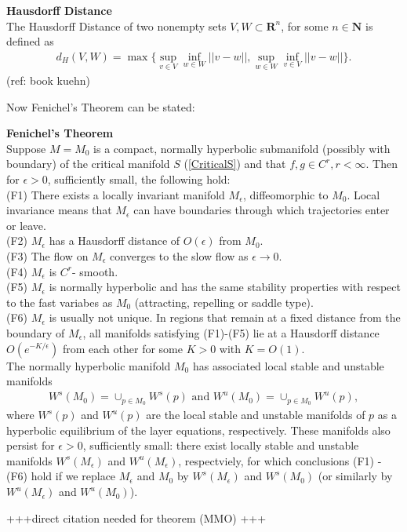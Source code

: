 \begin{definition}{\textbf{Hausdorff Distance}}\\
	The Hausdorff Distance of two nonempty sets $V,W \subset \mathbf{R}^n$, for some $n \in \mathbf{N}$ 
	is defined as 
	\begin{align*}
	d_H(V,W)= \max \{ \sup_{v \in V} \inf_{w \in W} || v- w ||, \sup_ {w \in W}\inf_{v \in V} || v- w ||\}.
	\end{align*}
	(ref: book kuehn)
\end{definition}

Now Fenichel's Theorem can be stated:
\begin{theorem}{\textbf{Fenichel's Theorem}} \label{Fenichel}
	\\
	Suppose $M=M_0$ is a compact, normally hyperbolic submanifold  (possibly with boundary) of the critical manifold $S$ (\ref{CriticalS}) and  that $f, g \in C^r, r < \infty $. Then for $\epsilon >0$, sufficiently small, the following hold:\\
	(F1) There exists a locally invariant manifold $M_{\epsilon}$, diffeomorphic to  $M_0$. Local invariance means that $M_{\epsilon}$ can have boundaries through which trajectories enter or leave.\\
	(F2) $M_{\epsilon}$ has a Hausdorff distance of $O(\epsilon)$ from $M_0$.\\
	(F3) The flow on $M_{\epsilon}$  converges to the slow flow as $\epsilon \to 0$.\\
	(F4) $M_{\epsilon}$ is $C^r$- smooth.\\
	(F5) $M_{\epsilon}$ is normally hyperbolic and has the same stability properties with respect to the fast variabes as $M_0$ (attracting, repelling or saddle type).\\
	(F6) $M_{\epsilon}$ is usually not unique. In regions that remain at a fixed distance from the boundary of  $M_{\epsilon}$, all manifolds satisfying (F1)-(F5) lie at a Hausdorff distance $O(e^{-K/\epsilon})$ from each other for some $K>0$ with $K=O(1)$.\\
	The normally hyperbolic manifold $M_0$ has associated local stable and unstable manifolds
	\begin{align*}
	W^s(M_0) =\cup_{p \in M_0} W^s(p) \textrm{\ \ and\ \ } W^u(M_0) =\cup_{p \in M_0} W^u(p),
	\end{align*}
	where  $W^s(p)$ and $W^u(p)$ are the local stable and unstable manifolds of $p$ as a hyperbolic equilibrium of the layer equations, respectively. These manifolds also persist for $\epsilon > 0$, sufficiently small: there exist locally stable and unstable manifolds $W^s(M_\epsilon)$ and $W^u(M_\epsilon)$, respectviely, for which conclusions (F1) - (F6) hold if we replace $M_\epsilon$ and $M_0$ by  $W^s(M_\epsilon)$ and $W^s(M_0)$ (or similarly by  $W^u(M_\epsilon)$ and $W^u(M_0)$).
\end{theorem} +++direct citation needed for theorem (MMO) +++


